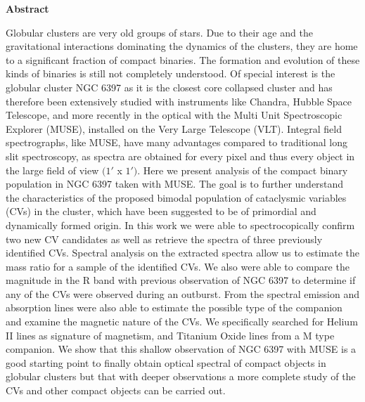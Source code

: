 \thispagestyle{empty}
\begin{Large}
\textbf{Abstract}
\end{Large}
\bigbreak
Globular clusters are very old groups of stars. Due to their age and the gravitational interactions dominating the dynamics of the clusters, they are home to a significant fraction of compact binaries. The formation
and evolution of these kinds of binaries is still not completely understood. Of special interest is the globular cluster NGC 6397 as it is the closest core collapsed cluster and has therefore been extensively studied
with instruments like Chandra, Hubble Space Telescope, and more recently in the optical with the Multi Unit Spectroscopic Explorer (MUSE), installed on the Very Large Telescope (VLT). Integral field spectrographs, like MUSE, have many advantages compared to traditional long slit spectroscopy, as spectra are obtained for every pixel and thus every object in the large field of view $(1'$ x $1')$. Here we present analysis of the compact binary population in NGC 6397 taken with MUSE. The goal is to further understand the characteristics of the proposed bimodal population of cataclysmic variables (CVs) in the cluster, which have been suggested to be of primordial and dynamically formed origin. In this work we were able to spectrocopically confirm two new CV candidates as well  as retrieve the spectra of three previously identified CVs. Spectral analysis on the extracted spectra allow us to estimate the mass ratio for a sample of the identified CVs. We also were able to compare the magnitude in the R band with previous observation of NGC 6397 to determine if any of the CVs were observed during an outburst.  From the spectral emission and absorption lines were also able to estimate the possible type of the companion and examine the magnetic nature of the CVs. We specifically searched for Helium II lines as signature of magnetism, and Titanium Oxide lines from a M type companion. We show that this shallow observation of NGC 6397 with MUSE is a good starting point to finally obtain optical spectral of compact objects in globular clusters but that with deeper observations a more complete study of the CVs and other compact objects can be carried out. 
\clearpage
